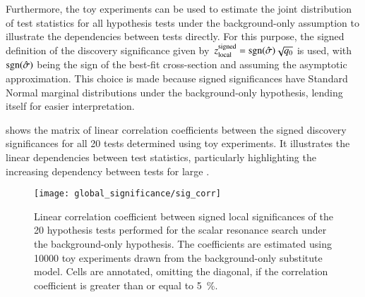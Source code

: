 
Furthermore, the toy experiments can be used to estimate the joint
distribution of test statistics for all hypothesis tests under the
background-only assumption to illustrate the dependencies between
tests directly. For this purpose, the signed definition of the
discovery significance given
by~$z_{\text{local}}^{\text{signed}} = \operatorname{sgn}(\hat{\sigma}) \sqrt{q_0}$
is used, with $\operatorname{sgn}(\hat{\sigma})$ being the sign of the best-fit
cross-section and assuming the asymptotic approximation. This choice
is made because signed significances have Standard Normal marginal
distributions under the background-only hypothesis, lending itself for
easier interpretation.

 shows the matrix of linear correlation
coefficients between the signed discovery significances for all 20
tests determined using toy experiments. It illustrates the linear
dependencies between test statistics, particularly highlighting the
increasing dependency between tests for large \mX.

\begin{figure}[htbp]
  \centering

  \texttt{[image: global\_significance/sig\_corr]}

  \caption{Linear correlation coefficient between signed local
    significances of the 20 hypothesis tests performed for the scalar
    resonance search under the background-only hypothesis. The
    coefficients are estimated using \num{10000} toy experiments drawn
    from the background-only substitute model. Cells are annotated,
    omitting the diagonal, if the correlation coefficient is greater
    than or equal to \SI{5}{\percent}.}%
  \label{fig:corr_sig}
\end{figure}

